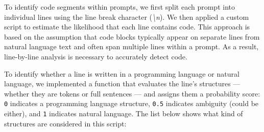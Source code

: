 To identify code segments within prompts, we first split each prompt into individual lines using the line break character (\textit{\textbackslash n}). We then applied a custom script to estimate the likelihood that each line contains code. This approach is based on the assumption that code blocks typically appear on separate lines from natural language text and often span multiple lines within a prompt. As a result, line-by-line analysis is necessary to accurately detect code.

To identify whether a line is written in a programming language or natural language, we implemented a function that evaluates the line’s structures --- whether they are tokens or full sentences --- and assigns them a probability score: \texttt{0} indicates a programming language structure, \texttt{0.5} indicates ambiguity (could be either), and \texttt{1} indicates natural language. The list below shows what kind of structures are considered in this script:

